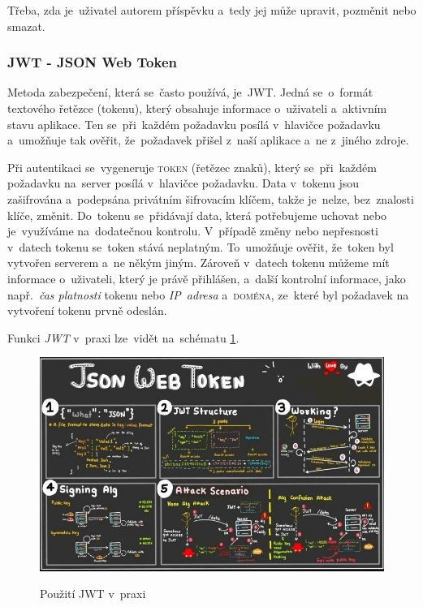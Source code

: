 \documentclass[14pt,a4paper]{article}
\begin{document}
            Třeba, zda je~uživatel autorem příspěvku a~tedy jej může upravit, pozměnit nebo smazat. \cite{graham2021ethical}

            \subsubsection{JWT - JSON Web Token}
            Metoda zabezpečení, která se~často používá, je~JWT. Jedná se~o~formát textového řetězce (tokenu), který obsahuje informace o~uživateli a~aktivním stavu aplikace. Ten se~při~každém požadavku posílá v~hlavičce požadavku a~umožňuje tak ověřit, že~požadavek přišel z~naší aplikace a~ne z~jiného zdroje.
            
            Při autentikaci se~vygeneruje \textsc{token} (řetězec znaků), který se~při~každém požadavku na~server posílá v~hlavičce požadavku. Data v~tokenu jsou zašifrována a~podepsána privátním šifrovacím klíčem, takže je~nelze, bez~znalosti klíče, změnit. Do~tokenu se~přidávají data, která potřebujeme uchovat nebo je~využíváme na~dodatečnou kontrolu. V~případě změny nebo nepřesnosti v~datech tokenu se~token stává neplatným. To~umožňuje ověřit, že~token byl vytvořen serverem a~ne někým jiným. Zároveň v~datech tokenu můžeme mít informace o~uživateli, který je právě přihlášen, a~další kontrolní informace, jako např.~\emph{čas platnosti} tokenu nebo \emph{IP~adresa} a~\textsc{doména}, ze~které byl požadavek na vytvoření tokenu prvně odeslán.

            Funkci \emph{JWT} v~praxi lze~vidět na~schématu \ref{model-jwt}.

            \begin{figure}
                \centering
                \includegraphics[width=.8\linewidth]{img/jwt.jpg}
                \label{model-jwt}
                \caption{Použití JWT v~praxi}
            \end{figure}
\end{document}
